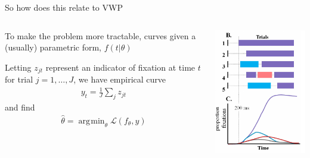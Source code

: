 \documentclass{beamer}
\DeclareMathOperator*{\argmin}{arg\!\min}
\begin{document}
\begin{frame}{So how does this relate to VWP}

\begin{columns}
\begin{column}{0.45\textwidth}
To make the problem more tractable, curves given a (usually) parametric form, $f(t| \theta)$ \\ \vspace{2mm}

Letting $z_{jt}$ represent an indicator of fixation at time $t$ for trial $j = 1, \dots, J$, we have empirical curve
\begin{align*}
y_{t} = \frac1J \sum_j z_{jt}
\end{align*}
and find
\begin{align*}
\hat{\theta} = \argmin_{\theta} \mathcal{L}(f_{\theta}, y)
\end{align*}

\end{column}
\begin{column}{0.5\textwidth}  %
\begin{center}
\includegraphics[scale=0.5]{img/bob_aggregate.png}
\end{center}
\end{column}
\end{columns}
\end{frame}
\end{document}
